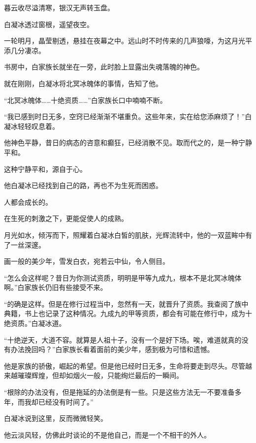 
\begin{this_body}



暮云收尽溢清寒，银汉无声转玉盘。

白凝冰透过窗根，遥望夜空。

一轮明月，晶莹剔透，悬挂在夜幕之中。远山时不时传来的几声狼嚎，为这月光平添几分凄凉。

书房中，白家族长就坐在一旁，此时脸上显露出失魂落魄的神色。

就在刚刚，白凝冰将北冥冰魄体的事情，告知了他。

“北冥冰魄体……十绝资质……”白家族长口中喃喃不断。

“我已感到时日无多，空窍已经渐渐不堪重负。这些年来，实在给您添麻烦了！”白凝冰轻轻叹息着。

他神色平静，昔日的病态的咨意和癫狂，已经消散不见。取而代之的，是一种宁静平和。

这种宁静平和，源自于心。

他白凝冰已经找到自己的路，再也不为生死而困惑。

人都会成长的。

在生死的刺激之下，更能促使人的成熟。

月光如水，倾泻而下，照耀着白凝冰白皙的肌肤，光辉流转中，他的一双蓝眸中有了一丝深邃。

画一般的美少年，雪发白衣，宛若云中仙，令人侧目。

“怎么会这样呢？昔日为你测试资质，明明是甲等九成九，根本不是北冥冰魄体啊。”白家族长仍旧有些接受不来。

“的确是这样。但是在修行过程当中，忽然有一天，就晋升了资质。我查阅了族中典籍，书上也记录了这种情况。九成九的甲等资质，都会有可能在修行中，成为十绝资质。”白凝冰道。

“十绝逆天，大道不容。就算是人祖十子，没有一个是好下场。唉，难道就真的没有办法挽回吗？”白家族长看着面前的美少年，感到极为可惜和遗憾。

他是家族的骄傲，崛起的希望。但是他已经时日无多，生命将要走到尽头。尽管越来越璀璨辉煌，但却如烟火一般，只能绚烂最后的一瞬间。

“根除的办法没有，但是拖延的办法倒是有一些。只是这些方法无一不要准备多年，而我却已经没有时间了。”

白凝冰说到这里，反而微微轻笑。

他云淡风轻，仿佛此时谈论的不是他自己，而是一个不相干的外人。


\end{this_body}
